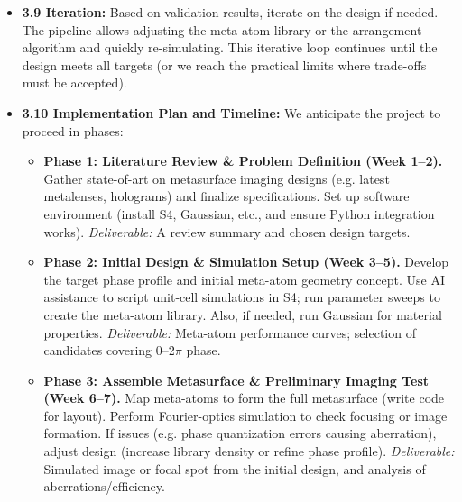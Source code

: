 \documentclass[11pt]{article}
\begin{document}
\begin{itemize}
\begin{itemize}[leftmargin=2em]
    \item \textbf{Comparison with Diffraction Limit or Theoretical Models:} Analyze the achieved imaging resolution vs. the theoretical diffraction limit for the aperture, and quantify any aberrations. If the metasurface is a lens, compute its focal length and compare with design; if a hologram, compute the fidelity (e.g. structural similarity index) between the reconstructed and target images.
    \item \textbf{Efficiency and Tolerance:} Calculate the optical efficiency (how much of the incident light is utilized for imaging) and examine the effect of small perturbations (manufacturing tolerances like dimension errors of meta-atoms). This step is crucial for a publication, demonstrating the design's viability. Tools like S4 can compute these by adjusting parameters, and an AI script can sweep tolerance scenarios automatically.
  \end{itemize}
  \item \textbf{3.9 Iteration:} Based on validation results, iterate on the design if needed. The pipeline allows adjusting the meta-atom library or the arrangement algorithm and quickly re-simulating. This iterative loop continues until the design meets all targets (or we reach the practical limits where trade-offs must be accepted).
  \item \textbf{3.10 Implementation Plan and Timeline:} We anticipate the project to proceed in phases:
  \begin{itemize}[leftmargin=2em]
    \item \textbf{Phase 1: Literature Review \& Problem Definition (Week 1--2).} Gather state-of-art on metasurface imaging designs (e.g. latest metalenses, holograms) and finalize specifications. Set up software environment (install S4, Gaussian, etc., and ensure Python integration works). \emph{Deliverable:} A review summary and chosen design targets.
    \item \textbf{Phase 2: Initial Design \& Simulation Setup (Week 3--5).} Develop the target phase profile and initial meta-atom geometry concept. Use AI assistance to script unit-cell simulations in S4; run parameter sweeps to create the meta-atom library. Also, if needed, run Gaussian for material properties. \emph{Deliverable:} Meta-atom performance curves; selection of candidates covering 0--2$\pi$ phase.
    \item \textbf{Phase 3: Assemble Metasurface \& Preliminary Imaging Test (Week 6--7).} Map meta-atoms to form the full metasurface (write code for layout). Perform Fourier-optics simulation to check focusing or image formation. If issues (e.g. phase quantization errors causing aberration), adjust design (increase library density or refine phase profile). \emph{Deliverable:} Simulated image or focal spot from the initial design, and analysis of aberrations/efficiency.

\end{itemize}
\end{itemize}
\end{document}
